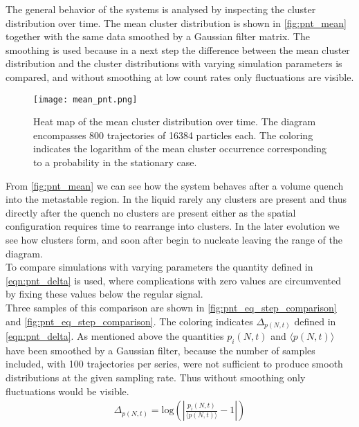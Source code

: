 The general behavior of the systems is analysed by inspecting the cluster distribution over time. The mean cluster distribution is shown in \autoref{fig:pnt_mean} together with the same data smoothed by a Gaussian filter matrix. The smoothing is used because in a next step the difference between the mean cluster distribution and the cluster distributions with varying simulation parameters is compared, and without smoothing at low count rates only fluctuations are visible.\\


\begin{figure}[h!]
\centering
\texttt{[image: mean\_pnt.png]}
\caption[Gaussian filter applied to cluster size distribution]{Heat map of the mean cluster distribution over time. The diagram encompasses 800 trajectories of 16384 particles each. The coloring indicates the logarithm of the mean cluster occurrence corresponding to a probability in the stationary case.}
\label{fig:pnt_mean}
\end{figure}

From \autoref{fig:pnt_mean} we can see how the system behaves after a volume quench into the metastable region. In the liquid rarely any clusters are present and thus directly after the quench no clusters are present either as the spatial configuration requires time to rearrange into clusters. In the later evolution we see how clusters form, and soon after begin to nucleate leaving the range of the diagram.\\

To compare simulations with varying parameters the quantity defined in \autoref{eqn:pnt_delta} is used, where complications with zero values are circumvented by fixing these values below the regular signal.\\ Three samples of this comparison are shown in \autoref{fig:pnt_eq_step_comparison} and \autoref{fig:pnt_eq_step_comparison}. The coloring indicates $\Delta_{p(N,t)}$ defined in \autoref{eqn:pnt_delta}. As mentioned above the quantities $p_i(N,t)$ and $\langle p(N,t) \rangle$ have been smoothed by a Gaussian filter, because the number of samples included, with 100 trajectories per series, were not sufficient to produce smooth distributions at the given sampling rate. Thus without smoothing only fluctuations would be visible.\\ 

\begin{align}
\label{eqn:pnt_delta}
\Delta_{p(N,t)} = \text{log} \left( \left| \frac{p_i(N,t)}{\langle p(N,t) \rangle} -1 \right| \right)
\end{align}

